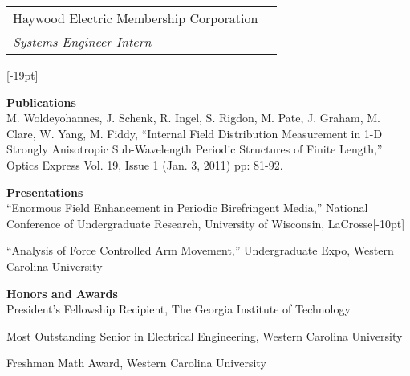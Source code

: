 \documentclass[10pt,letterpaper]{article}
\begin{document}
\vspace{-5pt}\noindent
\begin{tabularx}{\textwidth}{@{} >{\lwidth}L >{\rwidth}R}
\footnotesize{Haywood Electric Membership Corporation} &
\\
\footnotesize{\textit{Systems Engineer Intern}} & \\
\end{tabularx}
[-19pt]

\bigskip
\noindent\textbf{\large{Publications}}\vspace{5.3pt}\\
\noindent
\footnotesize{M. Woldeyohannes, J. Schenk, R. Ingel, S. Rigdon, M. Pate, J. Graham, M. Clare, W. Yang, M. Fiddy, ``Internal Field Distribution Measurement in 1-D Strongly Anisotropic Sub-Wavelength Periodic Structures of Finite Length,'' Optics Express Vol. 19, Issue 1 (Jan. 3, 2011) pp: 81-92.}

\bigskip
\noindent\textbf{\large{Presentations}}\vspace{5.3pt}\\
\footnotesize{``Enormous  Field  Enhancement  in  Periodic  Birefringent Media,''
National Conference of Undergraduate Research, University of Wisconsin, LaCrosse}[-10pt]

\medskip\noindent
\footnotesize{``Analysis of Force Controlled Arm Movement,'' Undergraduate Expo, Western Carolina University}

\bigskip
\noindent\textbf{\large{Honors and Awards}}\vspace{5.3pt}\\
\noindent\footnotesize{President's Fellowship Recipient, The Georgia Institute of Technology}

\medskip
\noindent\footnotesize{Most Outstanding Senior in Electrical Engineering, Western Carolina University}

\medskip
\noindent\footnotesize{Freshman Math Award, Western Carolina University}
\end{document}

